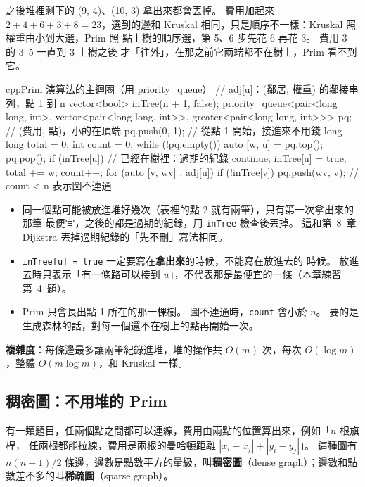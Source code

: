 之後堆裡剩下的 (9, 4)、(10, 3) 拿出來都會丟掉。 費用加起來 $2 + 4 + 6 + 3 + 8 =
23$，選到的邊和 Kruskal 相同，只是順序不一樣：Kruskal 照權重由小到大選，Prim 照
點上樹的順序選，第 5、6 步先花 $6$ 再花 $3$。 費用 $3$ 的 3--5 一直到 3 上樹之後
才「往外」，在那之前它兩端都不在樹上，Prim 看不到它。

\begin{code}{cpp}{Prim 演算法的主迴圈（用 priority\_queue）}
// adj[u]：(鄰居, 權重) 的鄰接串列，點 1 到 n
vector<bool> inTree(n + 1, false);
priority_queue<pair<long long, int>, vector<pair<long long, int>>,
               greater<pair<long long, int>>> pq;   // (費用, 點)，小的在頂端
pq.push({0, 1});                        // 從點 1 開始，接進來不用錢
long long total = 0;
int count = 0;
while (!pq.empty()) {
    auto [w, u] = pq.top();
    pq.pop();
    if (inTree[u]) {                    // 已經在樹裡：過期的紀錄
        continue;
    }
    inTree[u] = true;
    total += w;
    count++;
    for (auto [v, wv] : adj[u]) {
        if (!inTree[v]) {
            pq.push({wv, v});
        }
    }
}
// count < n 表示圖不連通
\end{code}

\begin{itemize}
\item 同一個點可能被放進堆好幾次（表裡的點 2 就有兩筆），只有第一次拿出來的那筆
最便宜，之後的都是過期的紀錄，用 \texttt{inTree} 檢查後丟掉。 這和第~8~章
Dijkstra 丟掉過期紀錄的「先不刪」寫法相同。
\item \texttt{inTree[u] = true} 一定要寫在\textbf{拿出來}的時候，不能寫在放進去的
時候。 放進去時只表示「有一條路可以接到 $u$」，不代表那是最便宜的一條（本章練習
第~4~題）。
\item Prim 只會長出點 1 所在的那一棵樹。 圖不連通時，\texttt{count} 會小於 $n$。
要的是生成森林的話，對每一個還不在樹上的點再開始一次。
\end{itemize}

\textbf{複雜度}：每條邊最多讓兩筆紀錄進堆，堆的操作共 $O(m)$ 次，每次
$O(\log m)$，整體 $O(m \log m)$，和 Kruskal 一樣。

\subsection{稠密圖：不用堆的 Prim}
\label{sec:prim-dense}

有一類題目，任兩個點之間都可以連線，費用由兩點的位置算出來，例如「$n$ 根旗桿，
任兩根都能拉線，費用是兩根的曼哈頓距離 $|x_i - x_j| + |y_i - y_j|$」。 這種圖有
$n(n - 1)/2$ 條邊，邊數是點數平方的量級，叫\textbf{稠密圖}（dense graph）；邊數和點
數差不多的叫\textbf{稀疏圖}（sparse graph）。

